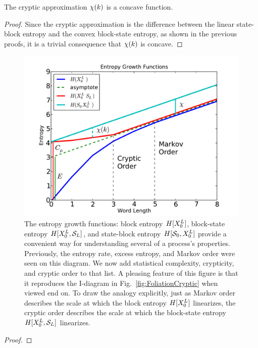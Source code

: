 \begin{Cor}
The cryptic approximation $\chi(k)$ is a concave function.
\end{Cor}

\begin{proof}
Since the cryptic approximation is the difference between the linear state-block entropy and the convex block-state entropy, as shown in the previous proofs, it is a trivial consequence that $\chi(k)$ is concave.
\end{proof}
\begin{figure}[h!]
\centering
\includegraphics[scale=0.6]{../chapter3/figures/EntropyGrowthCurvescryptic}
\caption{The entropy growth functions: block entropy $H[{X}_0^L]$, block-state entropy $H[{X}_0^L, \mathcal{S}_L]$, and state-block entropy $H[\mathcal{S}_0, {X}_0^L]$ provide a convenient way for understanding several of a process's properties. Previously, the entropy rate, excess entropy, and Markov order were seen on this diagram. We now add statistical complexity, crypticity, and cryptic order to that list. A pleasing feature of this figure is that it reproduces the I-diagram in Fig.~\ref{fig:FoliationCryptic} when viewed end on. To draw the analogy explicitly, just as Markov order describes the scale at which the block entropy $H[{X}_0^L]$ linearizes, the cryptic order describes the scale at which the block-state entropy $H[{X}_0^L, \mathcal{S}_L]$ linearizes.}
\label{fig:EntropyGrowthCurvescryptic}
\end{figure}

\begin{Prop}

\end{Prop}
\begin{proof}

\end{proof}

